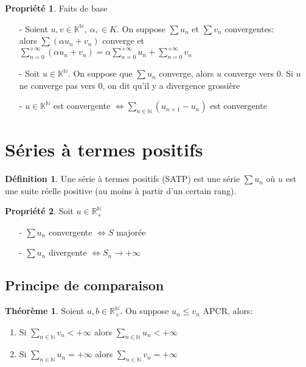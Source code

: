\documentclass[fleqn]{article}
\theoremstyle{definition} \newtheorem*{defi}{D\'efinition}
\theoremstyle{definition} \newtheorem*{theo}{Th\'eor\`eme}
\theoremstyle{definition} \newtheorem*{coro}{Corollaire}
\theoremstyle{remark} \newtheorem*{rqs}{Remarques}
\theoremstyle{definition} \newtheorem*{prop}{Propri\'et\'e}
\begin{document}
\begin{prop} Faits de base
	\begin{enumerate}
		\item [-] Soient $u,v \in \mathbb{K}^{\mathbb{N}},\ \alpha, \in K$. On suppose $\sum u_n$ et $\sum v_n$ convergentes:\\
			alors $\sum(\alpha u_n + v_n)$ converge et $\sum_{n=0}^{+\infty} (\alpha u_n + v_n) = \alpha \sum_{n=0}^{+\infty} u_n +
			\sum_{n=0}^{+\infty} v_n$
		\item [-] Soit $u \in \mathbb{K}^\mathbb{N}$. On suppose que $\sum u_n$ converge, alors $u$ converge vers $0$. Si $u$ ne converge
			pas vers $0$, on dit qu'il y a divergence grossi\`ere
		\item [-] $u \in \mathbb{K}^\mathbb{N}$ est convergente $\Leftrightarrow \sum_{n \in \mathbb{N}} (u_{n+1} - u_n)$ est convergente
	\end{enumerate}
\end{prop}

\section{S\'eries \`a termes positifs}
\begin{defi}
Une s\'erie \`a termes positifs (SATP) est une s\'erie $\sum u_n$ o\`u $u$ est une suite r\'eelle positive (au moins \`a partir d'un
	certain rang).
\end{defi}

\begin{prop} Soit $u \in \mathbb{R}_{+}^{\mathbb{N}}$
	\begin{enumerate}
		\item [-] $\sum u_n$ convergente $\Leftrightarrow S$ major\'ee
		\item [-] $\sum u_n$ divergente $\Leftrightarrow S_n \rightarrow +\infty$
	\end{enumerate}
\end{prop}

\subsection{Principe de comparaison}
\begin{theo} Soient $u,b \in \mathbb{R}_+^{\mathbb{N}}$. On suppose $u_n \leq v_n$ APCR, alors:
\begin{enumerate}
	\item Si $\sum_{n \in \mathbb{N}} v_n < +\infty$ alors $\sum_{n \in \mathbb{N}} u_n < +\infty$
	\item Si $\sum_{n \in \mathbb{N}} u_n = +\infty$ alors $\sum_{n \in \mathbb{N}} v_n = +\infty$
\end{enumerate}
\end{theo}
\end{document}
